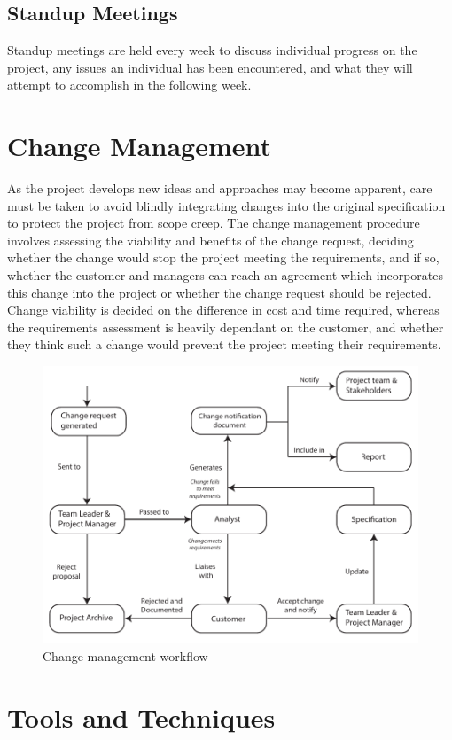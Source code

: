 \subsection{Standup Meetings}
Standup meetings are held every week to discuss individual progress on the project, any issues an individual has been encountered, and what they will attempt to accomplish in the following week.

\section{Change Management}
As the project develops new ideas and approaches may become apparent, care must be taken to avoid blindly integrating changes into the original specification to protect the project from scope creep. The change management procedure involves assessing the viability and benefits of the change request, deciding whether the change would stop the project meeting the requirements, and if so, whether the customer and managers can reach an agreement which incorporates this change into the project or whether the change request should be rejected. Change viability is decided on the difference in cost and time required, whereas the requirements assessment is heavily dependant on the customer, and whether they think such a change would prevent the project meeting their requirements.

\begin{figure}[h!]
	\includegraphics{"res/Change management diagram"}
	\caption{Change management workflow}
\end{figure}

\section{Tools and Techniques}

